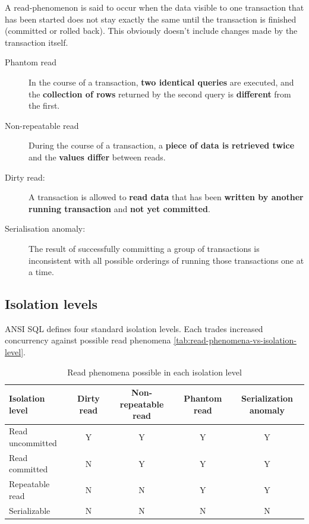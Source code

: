 \documentclass{pgnotes}
\begin{document}
A read-phenomenon is said to occur when the data visible to one transaction that has been started does not stay exactly the same until the transaction is finished (committed or rolled back). 
This obviously doesn't include changes made by the transaction itself.

\begin{description}
\item[Phantom read] In the course of a transaction, \textbf{two identical queries} are executed, and the \textbf{collection of rows} returned by the second query is \textbf{different} from the first.
\item[Non-repeatable read] During the course of a transaction, a \textbf{piece of data is retrieved twice} and the \textbf{values differ} between reads.
\item[Dirty read:] A transaction is allowed to \textbf{read data} that has been \textbf{written by another running transaction} and \textbf{not yet committed}.
\item[Serialisation anomaly:] The result of successfully committing a group of transactions is inconsistent with all possible orderings of running those transactions one at a time.
\end{description}
  
\subsection{Isolation levels}

ANSI SQL defines four standard isolation levels.
Each trades increased concurrency against possible read phenomena \autoref{tab:read-phenomena-vs-isolation-level}.

\begin{table}[htbp]
  \centering
  \begin{tabular}{l c c c c}
    \toprule
    \textbf{Isolation level} & \textbf{Dirty read} & \textbf{Non-repeatable read} & \textbf{Phantom read} & \textbf{Serialization anomaly} \\
    \midrule
    Read uncommitted & Y & Y & Y & Y \\
    Read committed & N & Y & Y & Y \\
    Repeatable read & N & N & Y & Y \\
    Serializable & N & N & N & N \\
    \bottomrule
  \end{tabular}
  \caption{Read phenomena possible in each isolation level}
  \label{tab:read-phenomena-vs-isolation-level}
\end{table}
\end{document}
